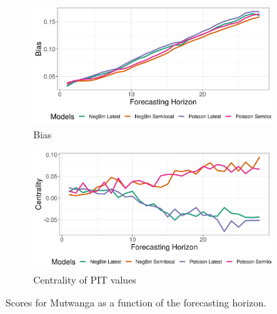 \begin{figure}[H]
\begin{subfigure}{0.5\textwidth}
  \centering
  \includegraphics[width=\linewidth]{../output/Mutwanga_bias.png}  
  \caption{Bias}
  \label{fig:Mutwanga_scores_3}
\end{subfigure}
\begin{subfigure}{0.5\textwidth}
  \centering
  \includegraphics[width=\linewidth]{../output/Mutwanga_centrality.png}  
  \caption{Centrality of PIT values}
  \label{fig:Mutwanga_scores_4}
\end{subfigure}
  \caption{Scores for Mutwanga as a function of the forecasting horizon.}

  \label{fig:nat_scores}
\end{figure}
